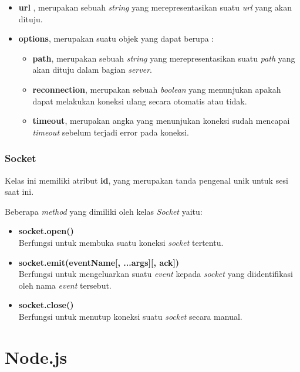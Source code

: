 \begin{itemize}
	\item \textbf{url} , merupakan sebuah \textit{string} yang merepresentasikan suatu \textit{url} yang akan dituju.
	\item \textbf{options}, merupakan suatu objek yang dapat berupa : 
		\begin{itemize}
			\item \textbf{path}, merupakan sebuah \textit{string} yang merepresentasikan suatu \textit{path} yang akan dituju dalam bagian \textit{server}.
			\item \textbf{reconnection}, merupakan sebuah \textit{boolean} yang menunjukan apakah dapat melakukan koneksi ulang secara otomatis atau tidak.
			\item \textbf{timeout}, merupakan angka yang menunjukan koneksi sudah mencapai \textit{timeout} sebelum terjadi error pada koneksi.
		\end{itemize}
\end{itemize}

\subsubsection{Socket}
Kelas ini memiliki atribut \textbf{id}, yang merupakan tanda pengenal unik untuk sesi saat ini.

Beberapa \textit{method} yang dimiliki oleh kelas \textit{Socket} yaitu: 

\begin{itemize}
	\item \textbf{socket.open()} \\ Berfungsi untuk membuka suatu koneksi \textit{socket} tertentu.
	\item \textbf{socket.emit(eventName[, ...args][, ack])} \\ Berfungsi untuk mengeluarkan suatu \textit{event} kepada \textit{socket} yang diidentifikasi oleh nama \textit{event} tersebut.
	\item \textbf{socket.close()} \\ Berfungsi untuk menutup koneksi suatu \textit{socket} secara manual. 
\end{itemize}


\section{Node.js}
\label{sec:Node.js}

